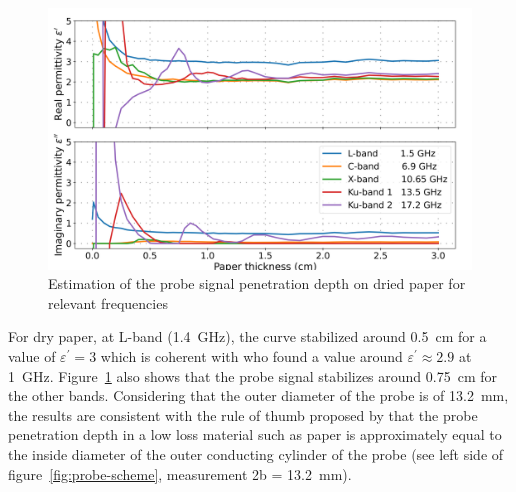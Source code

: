 \begin{figure}[ht!]
    \centering
    \includegraphics[width=\columnwidth]{Images/dry-paper.png}
    \caption[]{Estimation of the probe signal penetration depth on dried paper for relevant frequencies}\label{fig:dry-paper}
\end{figure}

For dry paper, at L-band (\qty{1.4}{\giga\hertz}), the curve stabilized around \qty{0.5}{\cm} for a value of \(\varepsilon^\prime = 3\) which is coherent with \parencite{Elrayes1987} who found a value around \(\varepsilon^\prime\approx2.9\) at \qty{1}{\giga\hertz}.
Figure~\ref{fig:dry-paper} also shows that the probe signal stabilizes around \qty{0.75}{\cm} for the other bands.
Considering that the outer diameter of the probe is of \qty{13.2}{\mm}, the results are consistent with the rule of thumb proposed by \textcite{Elrayes1987} that the probe penetration depth in a low loss material such as paper is approximately equal to the inside diameter of the outer conducting cylinder of the probe (see left side of figure~\ref{fig:probe-scheme}, measurement 2b = \qty{13.2}{\mm}).


